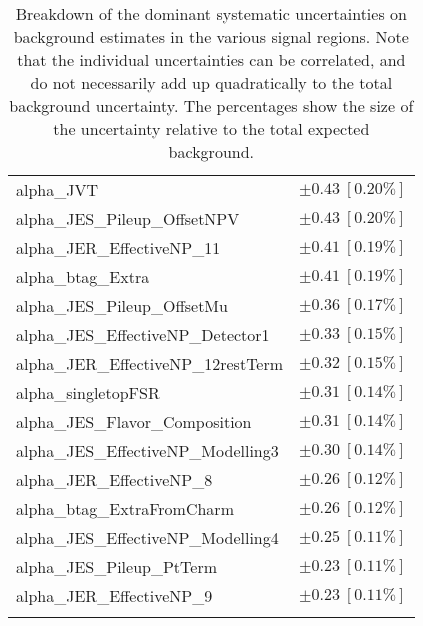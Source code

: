 \begin{table}
\begin{center}
\begin{tabular*}{\textwidth}{@{\extracolsep{\fill}}lc}
alpha\_JVT         & $\pm 0.43\ [0.20\%] $       \\
alpha\_JES\_Pileup\_OffsetNPV         & $\pm 0.43\ [0.20\%] $       \\
alpha\_JER\_EffectiveNP\_11         & $\pm 0.41\ [0.19\%] $       \\
alpha\_btag\_Extra         & $\pm 0.41\ [0.19\%] $       \\
alpha\_JES\_Pileup\_OffsetMu         & $\pm 0.36\ [0.17\%] $       \\
alpha\_JES\_EffectiveNP\_Detector1         & $\pm 0.33\ [0.15\%] $       \\
alpha\_JER\_EffectiveNP\_12restTerm         & $\pm 0.32\ [0.15\%] $       \\
alpha\_singletopFSR         & $\pm 0.31\ [0.14\%] $       \\
alpha\_JES\_Flavor\_Composition         & $\pm 0.31\ [0.14\%] $       \\
alpha\_JES\_EffectiveNP\_Modelling3         & $\pm 0.30\ [0.14\%] $       \\
alpha\_JER\_EffectiveNP\_8         & $\pm 0.26\ [0.12\%] $       \\
alpha\_btag\_ExtraFromCharm         & $\pm 0.26\ [0.12\%] $       \\
alpha\_JES\_EffectiveNP\_Modelling4         & $\pm 0.25\ [0.11\%] $       \\
alpha\_JES\_Pileup\_PtTerm         & $\pm 0.23\ [0.11\%] $       \\
alpha\_JER\_EffectiveNP\_9         & $\pm 0.23\ [0.11\%] $       \\
\noalign{\smallskip}\hline\noalign{\smallskip}
\end{tabular*}
\end{center}
\caption[Breakdown of uncertainty on background estimates]{
Breakdown of the dominant systematic uncertainties on background estimates in the various signal regions.
Note that the individual uncertainties can be correlated, and do not necessarily add up quadratically to 
the total background uncertainty. The percentages show the size of the uncertainty relative to the total expected background.
\label{table.results.bkgestimate.uncertainties.VRtt3onEM_cuts}}
\end{table}
%
